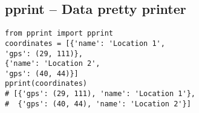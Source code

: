 \subsection{pprint -- Data pretty printer}
\begin{verbatim}
from pprint import pprint
coordinates = [{'name': 'Location 1',
'gps': (29, 111)},
{'name': 'Location 2',
'gps': (40, 44)}]
pprint(coordinates)
# [{'gps': (29, 111), 'name': 'Location 1'},
#  {'gps': (40, 44), 'name': 'Location 2'}]
\end{verbatim}